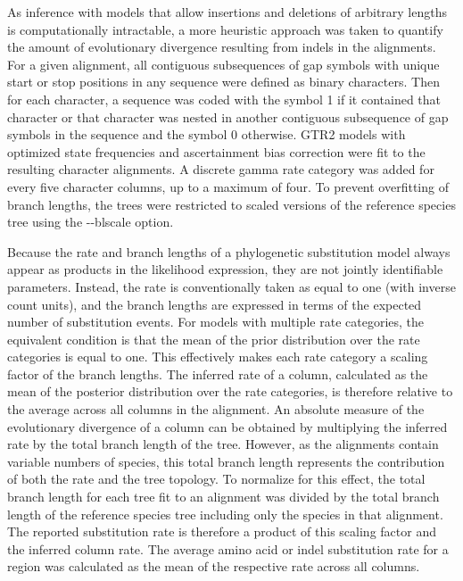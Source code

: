 As inference with models that allow insertions and deletions of arbitrary lengths is computationally intractable, a more heuristic approach was taken to quantify the amount of evolutionary divergence resulting from indels in the alignments. For a given alignment, all contiguous subsequences of gap symbols with unique start or stop positions in any sequence were defined as binary characters. Then for each character, a sequence was coded with the symbol 1 if it contained that character or that character was nested in another contiguous subsequence of gap symbols in the sequence and the symbol 0 otherwise. GTR2 models with optimized state frequencies and ascertainment bias correction were fit to the resulting character alignments. A discrete gamma rate category was added for every five character columns, up to a maximum of four. To prevent overfitting of branch lengths, the trees were restricted to scaled versions of the reference species tree using the -{}-blscale option.

Because the rate and branch lengths of a phylogenetic substitution model always appear as products in the likelihood expression, they are not jointly identifiable parameters. Instead, the rate is conventionally taken as equal to one (with inverse count units), and the branch lengths are expressed in terms of the expected number of substitution events. For models with multiple rate categories, the equivalent condition is that the mean of the prior distribution over the rate categories is equal to one. This effectively makes each rate category a scaling factor of the branch lengths. The inferred rate of a column, calculated as the mean of the posterior distribution over the rate categories, is therefore relative to the average across all columns in the alignment. An absolute measure of the evolutionary divergence of a column can be obtained by multiplying the inferred rate by the total branch length of the tree. However, as the alignments contain variable numbers of species, this total branch length represents the contribution of both the rate and the tree topology. To normalize for this effect, the total branch length for each tree fit to an alignment was divided by the total branch length of the reference species tree including only the species in that alignment. The reported substitution rate is therefore a product of this scaling factor and the inferred column rate. The average amino acid or indel substitution rate for a region was calculated as the mean of the respective rate across all columns.

